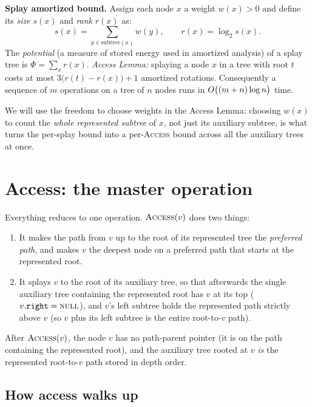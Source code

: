 \begin{formalbox}
\textbf{Splay amortized bound.} Assign each node $x$ a weight $w(x)>0$ and define
its \emph{size} $s(x)$ and \emph{rank} $r(x)$ as:
\[
  s(x) = \sum_{y\in\text{subtree}(x)} w(y), \qquad r(x) = \log_2 s(x).
\]
The \emph{potential} (a measure of stored energy used in amortized analysis) of a splay tree is $\Phi=\sum_x r(x)$.
\emph{Access Lemma:} splaying a node $x$ in a tree with root $t$ costs at most
$3\bigl(r(t)-r(x)\bigr)+1$ amortized rotations. Consequently a sequence of $m$
operations on a tree of $n$ nodes runs in $O\bigl((m+n)\log n\bigr)$ time.
\end{formalbox}

We will use the freedom to choose weights in the Access Lemma:
choosing $w(x)$ to count the \emph{whole represented subtree} of $x$, not just
its auxiliary subtree, is what turns the per-splay bound into a per-\textsc{Access}
bound across all the auxiliary trees at once.

\section{Access: the master operation}
\label{ch22:access}

Everything reduces to one operation. $\textsc{Access}(v)$ does two things:

\begin{enumerate}
  \item It makes the path from $v$ up to the root of its represented tree the
        \emph{preferred path}, and makes $v$ the deepest node on a preferred path
        that starts at the represented root.
  \item It splays $v$ to the root of its auxiliary tree, so that afterwards the
        single auxiliary tree containing the represented root has $v$ at its top
        ($v.\texttt{right}=\textsc{null}$), and $v$'s left subtree holds the
        represented path strictly above $v$ (so $v$ plus its left subtree is the
        entire root-to-$v$ path).
\end{enumerate}

After $\textsc{Access}(v)$, the node $v$ has no path-parent pointer (it is on the
path containing the represented root), and the auxiliary tree rooted at $v$
\emph{is} the represented root-to-$v$ path stored in depth order.

\subsection{How access walks up}

